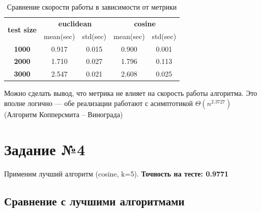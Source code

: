 \documentclass[12pt,fleqn]{article}
\begin{document}
\begin{table}[htb]
    \centering
    \begin{tabular}{|c|c|c|c|c|}
    \hline
    \multirow{2}{*}{\textbf{test size}} & \multicolumn{2}{c|}{\textbf{euclidean}} & \multicolumn{2}{c|}{\textbf{cosine}} \\ \cline{2-5} 
                                        & mean(sec)           & std(sec)          & mean(sec)         & std(sec)         \\ \hline
    \textbf{1000}                       & 0.917               & 0.015             & 0.900             & 0.001            \\ \hline
    \textbf{2000}                       & 1.710               & 0.027             & 1.796             & 0.113            \\ \hline
    \textbf{3000}                       & 2.547               & 0.021             & 2.608             & 0.025           \\ \hline
    \end{tabular}
    \caption{Сравнение скорости работы в зависимости от метрики}
\end{table}

Можно сделать вывод, что метрика не влияет на скорость работы алгоритма. Это вполне логично ---
 обе реализации работают с асимптотикой $\Theta(n^{2.3727})$ (Алгоритм Копперсмита -- Винограда)

\section{Задание №4}
Применим лучший алгоритм (cosine, k=5).
\textcolor{blue(ryb)}{\textbf{Точность на тесте: 0.9771}}

\subsection{Сравнение с лучшими алгоритмами}
\end{document}
